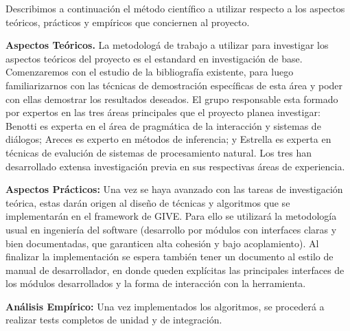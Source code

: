 
Describimos a continuaci\'on el m\'etodo cient\'ifico a utilizar
respecto a los aspectos te\'oricos, pr\'acticos y emp\'iricos
que conciernen al proyecto.

\begin{myitemize}
\item \textbf{Aspectos Te\'oricos.}
La metodolog\'a de trabajo a utilizar para investigar los aspectos
te\'oricos del proyecto es el estandard en investigaci\'on de base.
Comenzaremos con el estudio de la bibliograf\'ia existente, para luego
familiarizarnos con las t\'ecnicas de demostraci\'on espec\'ificas de esta
\'area y poder con ellas demostrar los resultados deseados. El grupo
responsable esta formado por expertos en las tres \'areas principales
que el proyecto planea investigar: Benotti es experta en el \'area de
pragm\'atica de la interacci\'on y sistemas de di\'alogos; Areces es
experto en m\'etodos de inferencia; y Estrella es experta en t\'ecnicas
de evaluci\'on de sistemas de procesamiento natural.
Los tres han desarrollado extensa investigaci\'on previa en sus respectivas
\'areas
de experiencia.

\item \textbf{Aspectos Pr\'acticos:}
Una vez se haya avanzado con las tareas de investigaci\'on te\'orica,
estas dar\'an origen al dise\~no de t\'ecnicas y algoritmos que se
implementar\'an en el framework de GIVE. Para ello se utilizar\'a la
metodolog\'ia
usual en ingenier\'ia del software (desarrollo por
m\'odulos con interfaces claras y bien documentadas,
que garanticen alta cohesi\'on y bajo acoplamiento).
Al finalizar la implementaci\'on
se espera tambi\'en tener un documento al estilo de manual de
desarrollador, en donde queden expl\'icitas las principales interfaces
de los m\'odulos desarrollados y la forma de interacci\'on con la
herramienta.


\item \textbf{An\'alisis Emp\'irico:}
Una vez
implementados los algoritmos, se proceder\'a a realizar tests
completos de unidad y de integraci\'on.

\end{myitemize}
